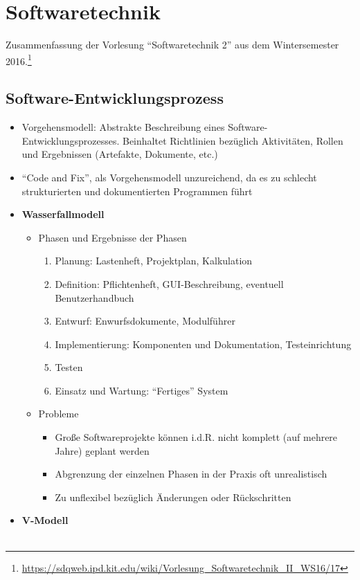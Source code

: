 \chapter{Softwaretechnik}

Zusammenfassung der Vorlesung "`Softwaretechnik 2"' aus dem Wintersemester 2016.\footnote{\url{https://sdqweb.ipd.kit.edu/wiki/Vorlesung_Softwaretechnik_II_WS16/17}}

\section{Software-Entwicklungsprozess}

\begin{itemize}
	\item Vorgehensmodell: Abstrakte Beschreibung eines Software-Entwicklungsprozesses. Beinhaltet Richtlinien bezüglich Aktivitäten, Rollen und Ergebnissen (Artefakte, Dokumente, etc.)
	\item "`Code and Fix"', als Vorgehensmodell unzureichend, da es zu schlecht strukturierten und dokumentierten Programmen führt
	\item \textbf{Wasserfallmodell}
	\begin{itemize}
		\item Phasen und Ergebnisse der Phasen
		\begin{enumerate}
			\item Planung: Lastenheft, Projektplan, Kalkulation
			\item Definition: Pflichtenheft, GUI-Beschreibung, eventuell Benutzerhandbuch
			\item Entwurf: Enwurfsdokumente, Modulführer
			\item Implementierung: Komponenten und Dokumentation, Testeinrichtung
			\item Testen
			\item Einsatz und Wartung: "`Fertiges"' System
		\end{enumerate}
		\item Probleme
		\begin{itemize}
			\item Große Softwareprojekte können i.d.R. nicht komplett (auf mehrere Jahre) geplant werden
			\item Abgrenzung der einzelnen Phasen in der Praxis oft unrealistisch
			\item Zu unflexibel bezüglich Änderungen oder Rückschritten
		\end{itemize}
	\end{itemize}
	\item \textbf{V-Modell} \\\\

\end{itemize}
